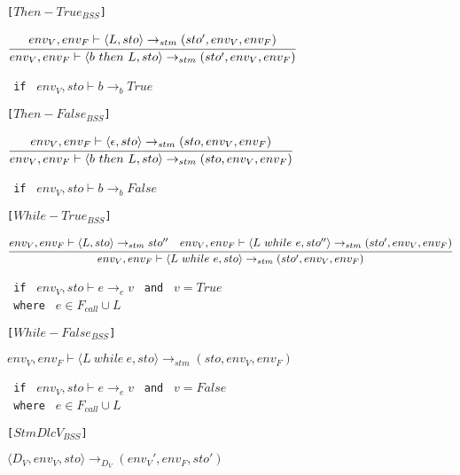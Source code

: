\texttt{[$Then-True_{BSS}$]}
\begin{center}
	\begin{math}
		\cfrac
			{env_V, env_F \vdash \langle L,sto \rangle \rightarrow_{stm} (sto', env_V, env_F)}
			{env_V, env_F \vdash \langle b\ then\ L, sto \rangle \rightarrow_{stm} (sto', env_V, env_F)}
	\end{math}
	
	\texttt{ if } $env_V, sto \vdash b \rightarrow_b True$
\end{center}

\texttt{[$Then-False_{BSS}$]}
\begin{center}
	\begin{math}
	\cfrac
	{env_V, env_F \vdash \langle \epsilon,sto \rangle \rightarrow_{stm} (sto, env_V, env_F)}
	{env_V, env_F \vdash \langle b\ then\ L, sto \rangle \rightarrow_{stm} (sto, env_V, env_F)}
	\end{math}
	
	\texttt{ if } $env_V, sto \vdash b \rightarrow_b False$
\end{center}

\texttt{[$While-True_{BSS}$]}
\begin{center}
	\begin{math}
		\cfrac
			{env_V, env_F \vdash \langle L, sto \rangle \rightarrow_{stm} sto'' \quad env_V, env_F \vdash \langle L\ while\ e, sto'' \rangle \rightarrow_{stm} (sto', env_V, env_F)}
			{env_V, env_F \vdash \langle L\ while\ e, sto \rangle \rightarrow_{stm} (sto', env_V, env_F)}
	\end{math}
	
	\texttt{ if } $env_V, sto \vdash e \rightarrow_e v$
	\texttt{ and } $v = True$\\
	\texttt{ where } $e \in F_{call} \cup L$
\end{center}

\texttt{[$While-False_{BSS}$]}
\begin{center}
	\begin{math}
	{env_V, env_F \vdash \langle L\ while\ e, sto \rangle \rightarrow_{stm} (sto, env_V, env_F)}
	\end{math}
	
	\texttt{ if } $env_V, sto \vdash e \rightarrow_e v$
	\texttt{ and } $v = False$\\
	\texttt{ where } $e \in F_{call} \cup L$
\end{center}

\texttt{[$StmDlcV_{BSS}$]}
\begin{center}
	$\langle D_V, env_V, sto \rangle \rightarrow_{D_V} (env_V', env_F, sto')$
\end{center}

